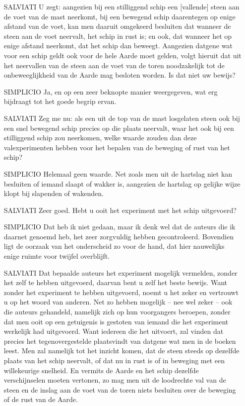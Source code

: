 {\footnotesize

\begin{enumerate}
\item[SALVIATI]U zegt: aangezien bij een stilliggend schip een [vallende] steen aan de voet van de mast neerkomt, bij een bewegend schip daarentegen op enige afstand van de voet, kan men daaruit omgekeerd besluiten dat wanneer de steen aan de voet neervalt, het schip in rust is; en ook, dat wanneer het op enige afstand neerkomt, dat het schip dan beweegt. Aangezien datgene wat voor een schip geldt ook voor de hele Aarde moet gelden, volgt hieruit dat uit het neervallen van de steen aan de voet van de toren noodzakelijk tot de onbeweeglijkheid van de Aarde mag besloten worden. Is dat niet uw bewijs?
\item[SIMPLICIO]Ja, en op een zeer beknopte manier weergegeven, wat erg bijdraagt tot het goede begrip ervan.
\item[SALVIATI]Zeg me nu: als een uit de top van de mast losgelaten steen ook bij een snel bewegend schip precies op die plaats neervalt, waar het ook bij een stilliggend schip zou neerkomen, welke waarde zouden dan deze valexperimenten hebben voor het bepalen van de beweging of rust van het schip?
\item[SIMPLICIO]Helemaal geen waarde. Net zoals men uit de hartslag niet kan besluiten of iemand slaapt of wakker is, aangezien de hartslag op gelijke wijze klopt bij slapenden of wakenden.
\item[SALVIATI]Zeer goed. Hebt u ooit het experiment met het schip uitgevoerd?
\item[SIMPLICIO]Dat heb ik niet gedaan, maar ik denk wel dat de auteurs die ik daarnet genoemd heb, het zeer zorgvuldig hebben gecontroleerd. Bovendien ligt de oorzaak van het onderscheid zo voor de hand, dat hier nauwelijks enige ruimte voor twijfel overblijft.
\item[SALVIATI]Dat bepaalde auteurs het experiment mogelijk vermelden, zonder het zelf te hebben uitgevoerd, daarvan bent u zelf het beste bewijs. Want zonder het experiment te hebben uitgevoerd, noemt u het zeker en vertrouwt u op het woord van anderen. Net zo hebben mogelijk -- nee wel zeker -- ook die auteurs gehandeld, namelijk zich op hun voorgangers beroepen, zonder dat men ooit op een getuigenis is gestoten van iemand die het experiment werkelijk had uitgevoerd. Want iedereen die het uitvoert, zal vinden dat precies het tegenovergestelde plaatsvindt van datgene wat men in de boeken leest. Men zal namelijk tot het inzicht komen, dat de steen steeds op dezelfde plaats van het schip neervalt, of dat nu in rust is of in beweging met een willekeurige snelheid. En vermits de Aarde en het schip dezelfde verschijnselen moeten vertonen, zo mag men uit de loodrechte val van de steen en de inslag aan de voet van de toren niets besluiten over de beweging of de rust van de Aarde.

\end{enumerate}}
